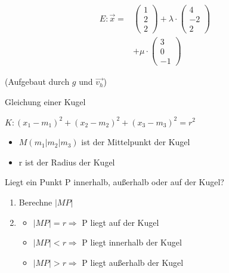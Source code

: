 \documentclass[paper=a6,ngerman,twoside=true,fontsize=14pt, parskip = half]{scrartcl}
\begin{document}
\begin{antwort}
	
	\begin{align*}
	E:\vec{x}=&\left(\begin{array}{c} 1 \\ 2 \\ 2\end{array} \right)+\lambda \cdot \left(\begin{array}{c} 4 \\ -2 \\ 2\end{array} \right)\\
	&+\mu \cdot \left(\begin{array}{c} 3 \\0 \\ -1\end{array} \right)
	\end{align*}
	\begin{center}
	(Aufgebaut durch $g$ und $\vec{v_h}$)
	\end{center}
	
\end{antwort}	
\begin{frage}
	Gleichung einer Kugel
\end{frage}
\begin{antwort}
	
	$K: (x_1-m_1)^2+(x_2-m_2)^2+(x_3-m_3)^2=r^2$
	
	\begin{itemize} 
		\item $M(m_1|m_2|m_3)$ ist der Mittelpunkt der Kugel
		\item r ist der Radius der Kugel	
	\end{itemize} 
\end{antwort}	
\begin{frage}
	Liegt ein Punkt P innerhalb, außerhalb oder auf der Kugel?
\end{frage}
\begin{antwort}
		
	\begin{enumerate} 
		\item Berechne $|MP|$
		\item 	\begin{itemize}
				\item $|MP|=r \Rightarrow$ P liegt auf der Kugel
				\item $|MP|<r \Rightarrow$ P liegt innerhalb der Kugel
				\item $|MP|>r \Rightarrow$ P liegt außerhalb der Kugel
				\end{itemize}	
	\end{enumerate} 
	
\end{antwort}	
\end{document}
